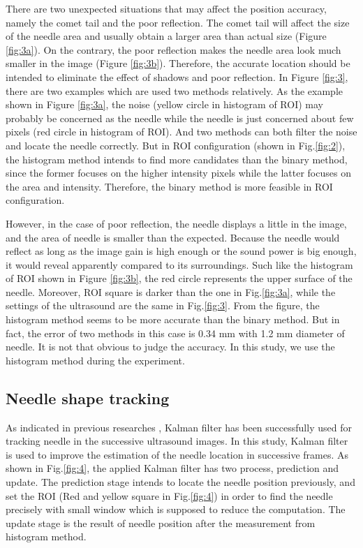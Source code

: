 \documentclass[journal,article,submit,moreauthors,pdftex]{Definitions/mdpi}
\begin{document}
There are two unexpected situations that may affect the position accuracy, namely the comet tail and the poor reflection.
The comet tail will affect the size of the needle area and usually obtain a larger area than actual size (Figure \ref{fig:3a}).
On the contrary, the poor reflection makes the needle area look much smaller in the image (Figure \ref{fig:3b}).
Therefore, the accurate location should be intended to eliminate the effect of shadows and poor reflection.
In Figure \ref{fig:3}, there are two examples which are used two methods relatively.
As the example shown in Figure \ref{fig:3a}, the noise (yellow circle in histogram of ROI) may probably be concerned as the needle while the needle is just concerned about few pixels (red circle in histogram of ROI).
And two methods can both filter the noise and locate the needle correctly.
But in ROI configuration (shown in Fig.\ref{fig:2}), the histogram method intends to find more candidates than the binary method, since the former focuses on the higher intensity pixels while the latter focuses on the area and intensity.
Therefore, the binary method is more feasible in ROI configuration.

However, in the case of poor reflection, the needle displays a little in the image, and the area of needle is smaller than the expected.
Because the needle would reflect as long as the image gain is high enough or the sound power is big enough, it would reveal apparently compared to its surroundings. Such like the histogram of ROI shown in Figure \ref{fig:3b}, the red circle represents the upper surface of the needle.
Moreover, ROI square is darker than the one in Fig.\ref{fig:3a}, while the settings of the ultrasound are the same in Fig.\ref{fig:3}.
From the figure, the histogram method seems to be more accurate than the binary method.
But in fact, the error of two methods in this case is 0.34 mm with 1.2 mm diameter of needle.
It is not that obvious to judge the accuracy.
In this study, we use the histogram method during the experiment.

\subsection{Needle shape tracking}

As indicated in previous researches \cite{Mignon2018,Mignon2016,Yue2012}, Kalman filter has been successfully used for tracking needle in the successive ultrasound images.
In this study, Kalman filter is used to improve the estimation of the needle location in successive frames.
As shown in Fig.\ref{fig:4}, the applied Kalman filter has two process, prediction and update.
The prediction stage intends to locate the needle position previously, and set the ROI (Red and yellow square in Fig.\ref{fig:4}) in order to find the needle precisely with small window which is supposed to reduce the computation.
The update stage is the result of needle position after the measurement from histogram method.
\end{document}
